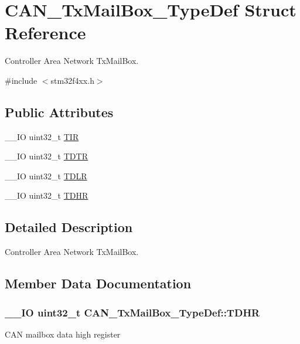 \hypertarget{struct_c_a_n___tx_mail_box___type_def}{}\section{C\+A\+N\+\_\+\+Tx\+Mail\+Box\+\_\+\+Type\+Def Struct Reference}
\label{struct_c_a_n___tx_mail_box___type_def}


Controller Area Network Tx\+Mail\+Box.  




{\ttfamily \#include $<$stm32f4xx.\+h$>$}

\subsection*{Public Attributes}
\begin{DoxyCompactItemize}
\item 
\+\_\+\+\_\+\+I\+O uint32\+\_\+t \hyperlink{struct_c_a_n___tx_mail_box___type_def_a22f525c909de2dcec1d4093fe1d562b8}{T\+I\+R}
\item 
\+\_\+\+\_\+\+I\+O uint32\+\_\+t \hyperlink{struct_c_a_n___tx_mail_box___type_def_a2351cb865d064cf75f61642aaa887f76}{T\+D\+T\+R}
\item 
\+\_\+\+\_\+\+I\+O uint32\+\_\+t \hyperlink{struct_c_a_n___tx_mail_box___type_def_a408c96501b1cc8bd527432736d132a39}{T\+D\+L\+R}
\item 
\+\_\+\+\_\+\+I\+O uint32\+\_\+t \hyperlink{struct_c_a_n___tx_mail_box___type_def_a98c6bcd7c9bae378ebf83fd9f5b59020}{T\+D\+H\+R}
\end{DoxyCompactItemize}


\subsection{Detailed Description}
Controller Area Network Tx\+Mail\+Box. 

\subsection{Member Data Documentation}
\hypertarget{struct_c_a_n___tx_mail_box___type_def_a98c6bcd7c9bae378ebf83fd9f5b59020}{}
\subsubsection[{T\+D\+H\+R}]{\setlength{\rightskip}{0pt plus 5cm}\+\_\+\+\_\+\+I\+O uint32\+\_\+t C\+A\+N\+\_\+\+Tx\+Mail\+Box\+\_\+\+Type\+Def\+::\+T\+D\+H\+R}\label{struct_c_a_n___tx_mail_box___type_def_a98c6bcd7c9bae378ebf83fd9f5b59020}
C\+A\+N mailbox data high register \hypertarget{struct_c_a_n___tx_mail_box___type_def_a408c96501b1cc8bd527432736d132a39}{}

